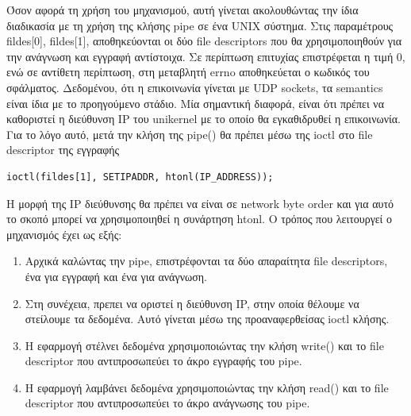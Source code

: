 Όσον αφορά τη χρήση του μηχανισμού, αυτή γίνεται ακολουθώντας την ίδια
διαδικασία με τη χρήση της κλήσης pipe σε ένα UNIX σύστημα. Στις παραμέτρους
fildes[0], fildes[1], αποθηκεύονται οι δύο file descriptors που θα
χρησιμοποιηθούν για την ανάγνωση και εγγραφή αντίστοιχα. Σε περίπτωση επιτυχίας
επιστρέφεται η τιμή 0, ενώ σε αντίθετη περίπτωση, στη μεταβλητή errno
αποθηκεύεται ο κωδικός του σφάλματος. Δεδομένου, ότι η επικοινωνία γίνεται με
UDP sockets, τα semantics είναι ίδια με το προηγούμενο στάδιο. Μία σημαντική
διαφορά, είναι ότι πρέπει να καθοριστεί η διεύθυνση IP του unikernel με το οποίο
θα εγκαθιδρυθεί η επικοινωνία. Για το λόγο αυτό, μετά την κλήση της pipe() θα
πρέπει μέσω της ioctl στο file descriptor της εγγραφής 
\begin{lstlisting}[numbers=none,  xleftmargin=.05\textwidth, xrightmargin=.05\textwidth]
ioctl(fildes[1], SETIPADDR, htonl(IP_ADDRESS));
\end{lstlisting}
Η μορφή της IP διεύθυνσης θα πρέπει να είναι σε network byte order
και για αυτό το σκοπό μπορεί να χρησιμοποιηθεί η συνάρτηση htonl.
Ο τρόπος που λειτουργεί ο μηχανισμός έχει ως εξής:
\begin{enumerate}
	\item Αρχικά καλώντας την pipe, επιστρέφονται τα δύο απαραίτητα file
		descriptors, ένα για εγγραφή και ένα για ανάγνωση.
	\item Στη συνέχεια, πρεπει να οριστεί η διεύθυνση IP, στην οποία θέλουμε
		να στείλουμε τα δεδομένα. Αυτό γίνεται μέσω της προαναφερθείσας
		ioctl κλήσης. 
	\item Η εφαρμογή στέλνει δεδομένα χρησιμοποιώντας την κλήση write() και
		το file descriptor που αντιπροσωπεύει το άκρο εγγραφής του pipe.
	\item H εφαρμογή λαμβάνει δεδομένα χρησιμοποιώντας την κλήση read() και
		το file descriptor που αντιπροσωπεύει το άκρο ανάγνωσης του pipe.
\end{enumerate}

